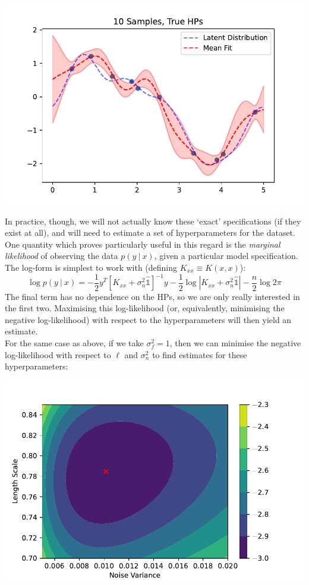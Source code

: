\documentclass[12pt]{article}
\newcommand{\idop}{\hat{\mathds{1}}}
\begin{document}
    \begin{center}
        \includegraphics{hp_known.pdf}
    \end{center}
    In practice, though, we will not actually know these `exact' specifications (if they exist at all), and will need to estimate a set of hyperparameters for the dataset. One quantity which proves particularly useful in this regard is the \textit{marginal likelihood} of observing the data $p(y\ |\ x)$, given a particular model specification. The log-form is simplest to work with (defining $K_{xx}\equiv K(x,x)$):
    \begin{equation*}
        \log p(y\ |\ x) = -\frac 12 y^T\left[ K_{xx} + \sigma_n^2\idop\right]^{-1}y - \frac 12\log\left| K_{xx} + \sigma_n^2\idop\right| - \frac n2\log 2\pi
    \end{equation*}
    The final term has no dependence on the HPs, so we are only really interested in the first two. Maximising this log-likelihood (or, equivalently, minimising the negative log-likelihood) with respect to the hyperparameters will then yield an estimate.\\
    For the same case as above, if we take $\sigma_f^2=1$, then we can minimise the negative log-likelihood with respect to $\ell$ and $\sigma_n^2$ to find estimates for these hyperparameters:
    \begin{center}
        \includegraphics{hp_contours.pdf}
    \end{center}
\end{document}
